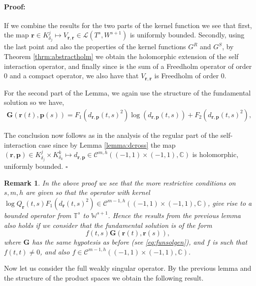 \documentclass{article}
\newtheorem{remark}[theorem]{Remark}
\newenvironment{proof}{\paragraph{Proof:}}{\hfill$\square$}
\newcommand{\IC}{{\mathbb C}}
\newcommand{\IT}{{\mathbb T}}
\newcommand{\IW}{{\mathbb W}}
\newcommand{\bp}{{\bm p}}
\newcommand{\cmspaceh}[4]{\mathcal{C}^{#1,#2} \left( #3, #4 \right)}
\newcommand{\br}{\bm{r}}
\newcommand{\iinterv}{(-1,1)\times(-1,1)}
\begin{document}
\begin{proof}
If we combine the results for the two parts of the kernel function we see that first, the map $\br \in K^j_{\delta_j} \mapsto V_{\br,\br} \in \mathcal{L}(T^s,W^{s+1})$ is uniformly bounded. Secondly, using the last point and also the properties of the kernel functions $G^R$ and $G^S$, by Theorem \ref{thrm:abstractholm} we obtain the holomorphic extension of the self interaction operator, and  finally since is the sum of a Freedholm operator of order $0$ and a compact operator, we also have that $V_{\br,\br}$ is Freedholm of order $0$. 

For the second part of the Lemma, we again use the structure of the fundamental solution so we have,
\begin{align*}
\mathbf{G}(\br(t),\bp(s)) = F_1(d_{\br,\bp}(t,s)^2) \log(d_{\br,\bp}(t,s)) + F_2(d_{\br,\bp}(t,s)^2),
\end{align*}

 The conclusion now follows as in the analysis of the regular part of the self-interaction case since by Lemma \ref{lemma:dcross} the map $(\br,\bp) \in K^j_{\delta_j} \times K^k_{\delta_k}\mapsto d_{\br,\bp} \in \cmspaceh{m}{h}{\iinterv}{\IC}$ is holomorphic, uniformly bounded. 
\end{proof} 

\begin{remark}
\label{remark:mm1extension}
In the above proof we see that the more restrictive conditions on $s,m,h$ are given so that the operator with kernel $\log Q_{\br}(t,s) F_1(d_{\br}(t,s)^2) \in \cmspaceh{m-1}{h}{\iinterv}{\IC}$, give rise to a bounded operator from $\IT^s$ to $\IW^{s+1}$. 
Hence the results from the previous lemma also holds if we consider that the fundamental solution is of the form 
$$
f(t,s) \mathbf{G}(\br(t),\br(s)),
$$
where $\mathbf{G}$ has the same hypotesis as before (see \eqref{eq:funsolgen}), and $f$ is such that $f(t,t) \neq 0$, and also $f \in \cmspaceh{m-1}{h}{\iinterv}{\IC}$. 
\end{remark}

Now let us consider the full weakly singular operator. By the previous lemma and the structure of the product spaces we obtain the following result. 
\end{document}
